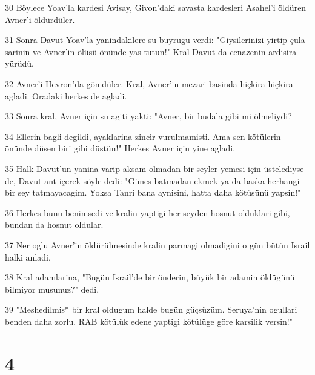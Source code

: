 \par 30 Böylece Yoav'la kardesi Avisay, Givon'daki savasta kardesleri Asahel'i öldüren Avner'i öldürdüler.
\par 31 Sonra Davut Yoav'la yanindakilere su buyrugu verdi: "Giysilerinizi yirtip çula sarinin ve Avner'in ölüsü önünde yas tutun!" Kral Davut da cenazenin ardisira yürüdü.
\par 32 Avner'i Hevron'da gömdüler. Kral, Avner'in mezari basinda hiçkira hiçkira agladi. Oradaki herkes de agladi.
\par 33 Sonra kral, Avner için su agiti yakti: "Avner, bir budala gibi mi ölmeliydi?
\par 34 Ellerin bagli degildi, ayaklarina zincir vurulmamisti. Ama sen kötülerin önünde düsen biri gibi düstün!" Herkes Avner için yine agladi.
\par 35 Halk Davut'un yanina varip aksam olmadan bir seyler yemesi için üstelediyse de, Davut ant içerek söyle dedi: "Günes batmadan ekmek ya da baska herhangi bir sey tatmayacagim. Yoksa Tanri bana aynisini, hatta daha kötüsünü yapsin!"
\par 36 Herkes bunu benimsedi ve kralin yaptigi her seyden hosnut olduklari gibi, bundan da hosnut oldular.
\par 37 Ner oglu Avner'in öldürülmesinde kralin parmagi olmadigini o gün bütün Israil halki anladi.
\par 38 Kral adamlarina, "Bugün Israil'de bir önderin, büyük bir adamin öldügünü bilmiyor musunuz?" dedi,
\par 39 "Meshedilmis* bir kral oldugum halde bugün güçsüzüm. Seruya'nin ogullari benden daha zorlu. RAB kötülük edene yaptigi kötülüge göre karsilik versin!"

\chapter{4}

